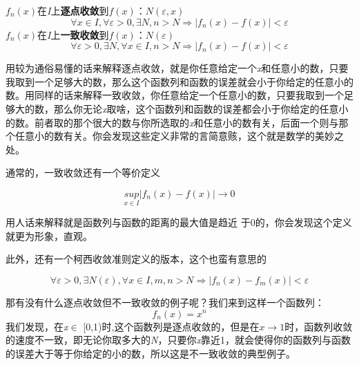 \documentclass[lang=cn,10pt]{elegantbook}
\begin{document}
\begin{definition}
	$f_{n}(x)$在\textit{I}上\textbf{逐点收敛}到$f(x)$：$N(\varepsilon,x)$
		\begin{equation*}
				\forall x\in I,\forall \varepsilon > 0,\exists N, 
				 n>N  \Longrightarrow |f_{n}(x)-f(x)|	<\varepsilon		
		\end{equation*}
	$f_{n}(x)$在\textit{I}上\textbf{一致收敛}到$f(x)$：$N(\varepsilon)$
		\begin{equation*}
			\forall \varepsilon > 0,\exists N,\forall x\in I, 
			n>N  \Longrightarrow |f_{n}(x)-f(x)|	<\varepsilon		
		\end{equation*}		
		
	
\end{definition}
用较为通俗易懂的话来解释逐点收敛，就是你任意给定一个\textit{x}和任意小的数，只要我取到一个足够大的数，那么这个函数列和函数的误差就会小于你给定的任意小的数。用同样的话来解释一致收敛，你任意给定一个任意小的数，只要我取到一个足够大的数，那么你无论\textit{x}取啥，这个函数列和函数的误差都会小于你给定的任意小的数。前者取的那个很大的数与你所选取的\textit{x}和任意小的数有关，后面一个则与那个任意小的数有关。你会发现这些定义非常的言简意赅，这个就是数学的美妙之处。

通常的，一致收敛还有一个等价定义
\begin{definition}
	\begin{equation*}
		\underset{x\in I}{sup} |f_{n}(x)-f(x)|\longrightarrow 0
	\end{equation*}
\end{definition}
用人话来解释就是函数列与函数的距离的最大值是趋近
于0的，你会发现这个定义就更为形象，直观。

此外，还有一个柯西收敛准则定义的版本，这个也蛮有意思的
\begin{definition}
	\begin{equation*}
		\forall \varepsilon > 0,\exists N(\varepsilon),\forall x\in I, 
		m,n>N  \Longrightarrow |f_{n}(x)-f_{m}(x)|	<\varepsilon
	\end{equation*}
\end{definition}
那有没有什么逐点收敛但不一致收敛的例子呢？我们来到这样一个函数列：
\begin{equation*}
	f_{n}(x)=x^{n}
\end{equation*}
我们发现，在\textit{x}$\in$ [0,1)时,这个函数列是逐点收敛的，但是在$x\longrightarrow 1$时，函数列收敛的速度不一致，即无论你取多大的\textit{N}，只要你\textit{x}靠近1，就会使得你的函数列与函数的误差大于等于你给定的小的数，所以这是不一致收敛的典型例子。
\end{document}
